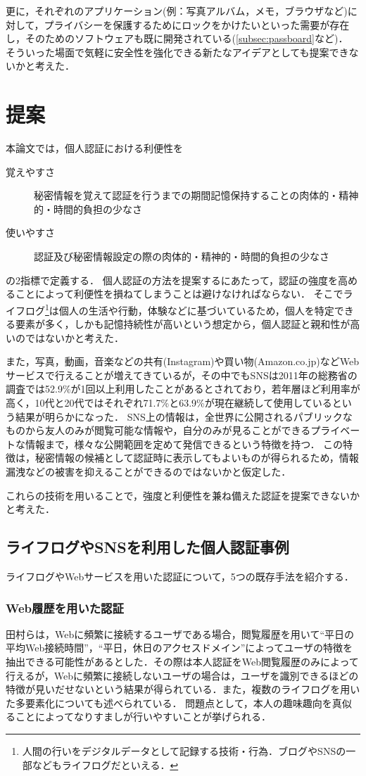 更に，それぞれのアプリケーション(例：写真アルバム，メモ，ブラウザなど)に対して，プライバシーを保護するためにロックをかけたいといった需要が存在し，そのためのソフトウェアも既に開発されている(\ref{subsec:passboard}など)．
そういった場面で気軽に安全性を強化できる新たなアイデアとしても提案できないかと考えた．

\section{提案}
本論文では，個人認証における利便性を
\begin{description}
  \item[覚えやすさ] 秘密情報を覚えて認証を行うまでの期間記憶保持することの肉体的・精神的・時間的負担の少なさ
  \item[使いやすさ] 認証及び秘密情報設定の際の肉体的・精神的・時間的負担の少なさ
\end{description}
の2指標で定義する．
個人認証の方法を提案するにあたって，認証の強度を高めることによって利便性を損ねてしまうことは避けなければならない．
そこでライフログ\footnote{人間の行いをデジタルデータとして記録する技術・行為．ブログやSNSの一部などもライフログだといえる．}は個人の生活や行動，体験などに基づいているため，個人を特定できる要素が多く，しかも記憶持続性が高いという想定から，個人認証と親和性が高いのではないかと考えた．

また，写真，動画，音楽などの共有(Instagram)や買い物(Amazon.co.jp)などWebサービスで行えることが増えてきているが，その中でもSNSは2011年の総務省の調査\cite{soumuWhitepaper2013Social}では52.9\%が1回以上利用したことがあるとされており，若年層ほど利用率が高く，10代と20代ではそれぞれ71.7\%と63.9\%が現在継続して使用しているという結果が明らかになった．
SNS上の情報は，全世界に公開されるパブリックなものから友人のみが閲覧可能な情報や，自分のみが見ることができるプライベートな情報まで，様々な公開範囲を定めて発信できるという特徴を持つ．
この特徴は，秘密情報の候補として認証時に表示してもよいものが得られるため，情報漏洩などの被害を抑えることができるのではないかと仮定した．

これらの技術を用いることで，強度と利便性を兼ね備えた認証を提案できないかと考えた．

\subsection{ライフログやSNSを利用した個人認証事例}\label{sec:lifeLogAuth}
ライフログやWebサービスを用いた認証について，5つの既存手法を紹介する．

\subsubsection{Web履歴を用いた認証}\label{subsec:webHistoryAuth}
田村ら\cite{田村健範:2011-07-14}は，Webに頻繁に接続するユーザである場合，閲覧履歴を用いて``平日の平均Web接続時間''，``平日，休日のアクセスドメイン''によってユーザの特徴を抽出できる可能性があるとした．その際は本人認証をWeb閲覧履歴のみによって行えるが，Webに頻繁に接続しないユーザの場合は，ユーザを識別できるほどの特徴が見いだせないという結果が得られている．また，複数のライフログを用いた多要素化についても述べられている．
問題点として，本人の趣味趣向を真似ることによってなりすましが行いやすいことが挙げられる．

